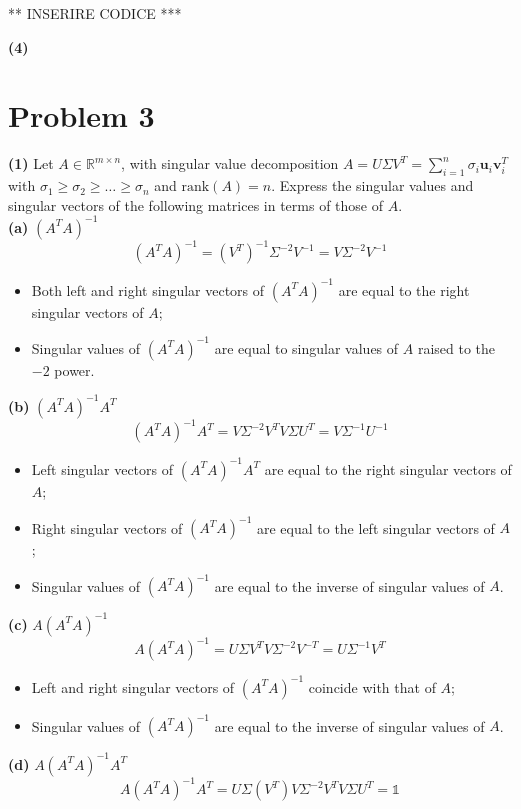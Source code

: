 \documentclass[a4paper,11pt]{article}
\newcommand{\R}{\mathbb{R}}
\begin{document}
\noindent *** INSERIRE CODICE ***

\noindent \textbf{(4)}


\section*{Problem 3}

\noindent \textbf{(1)} Let $A \in \R^{m\times n}$, with singular value decomposition $A = U \Sigma V^T = \sum_{i=1}^n \sigma_i \textbf{u}_i \textbf{v}_i^T$ with $\sigma_1 \ge \sigma_2 \ge \dots \ge \sigma_n$ and $\text{rank}(A) = n$. Express the singular values and singular vectors of the following matrices in terms of those of $A$.\\

\textbf{(a)} $(A^{T}A)^{-1}$
\[(A^{T}A)^{-1} = (V^{T})^{-1}\Sigma^{-2}V^{-1}=V\Sigma^{-2}V^{-1}\]
\begin{itemize}
	\item Both left and right singular vectors of $(A^{T}A)^{-1}$ are equal to the right singular vectors of $A$;
	\item Singular values of $(A^{T}A)^{-1}$ are equal to singular values of $A$ raised to the $-2$ power.
\end{itemize}

\textbf{(b)} $(A^{T}A)^{-1}A^{T}$
\[(A^{T}A)^{-1}A^{T} = V\Sigma^{-2}V^{T}V\Sigma U^{T}=V\Sigma^{-1}U^{-1}\]
\begin{itemize}
	\item Left singular vectors of $(A^{T}A)^{-1}A^{T}$ are equal to the right singular vectors of $A$;
	\item Right singular vectors of $(A^{T}A)^{-1}$ are equal to the left singular vectors of $A$;
	\item Singular values of $(A^{T}A)^{-1}$ are equal to the inverse of singular values of $A$.
\end{itemize}

\textbf{(c)} $A(A^{T}A)^{-1}$
\[A(A^{T}A)^{-1} = U\Sigma V^{T}V\Sigma^{-2}V^{-T}=U\Sigma^{-1}V^{T}\]
\begin{itemize}
	\item Left and right singular vectors of $(A^{T}A)^{-1}$ coincide with that of $A$;
	\item Singular values of $(A^{T}A)^{-1}$ are equal to the inverse of singular values of $A$.
\end{itemize}

\textbf{(d)} $A(A^{T}A)^{-1}A^{T}$
\[A(A^{T}A)^{-1}A^{T} = U\Sigma (V^{T})V\Sigma^{-2}V^{T}V\Sigma U^{T}=\mathbb{1}\]
\end{document}
